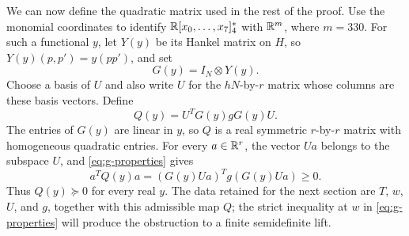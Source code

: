 We can now define the quadratic matrix used in the rest of the
proof.  Use the monomial coordinates to identify
$\mathbb R[x_0,\ldots,x_7]_4^*$ with $\mathbb R^m$, where $m=330$.
For such a functional $y$, let $Y(y)$ be its Hankel matrix on $H$,
so $Y(y)(p,p')=y(pp')$, and set
\[
 G(y)=I_N\otimes Y(y).
\]
Choose a basis of $U$ and also write $U$ for the $hN$-by-$r$ matrix
whose columns are these basis vectors.  Define
\begin{equation}
\label{eq:constructed-Q}
 Q(y)=U^TG(y)gG(y)U.
\end{equation}
The entries of $G(y)$ are linear in $y$, so $Q$ is a real symmetric
$r$-by-$r$ matrix with homogeneous quadratic entries.  For every
$a\in\mathbb R^r$, the vector $Ua$ belongs to the subspace $U$, and
\eqref{eq:g-properties} gives
\[
 a^TQ(y)a=(G(y)Ua)^Tg(G(y)Ua)\ge0.
\]
Thus $Q(y)\succeq0$ for every real $y$.  The data retained for the
next section are $T$, $w$, $U$, and $g$, together with this
admissible map $Q$; the strict inequality at $w$ in
\eqref{eq:g-properties} will produce the obstruction to a finite
semidefinite lift.
